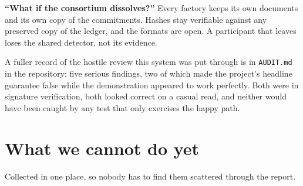 \documentclass[11pt,a4paper]{article}
\begin{document}
\textbf{``What if the consortium dissolves?''}
Every factory keeps its own documents and its own copy of the commitments.
Hashes stay verifiable against any preserved copy of the ledger, and the formats
are open. A participant that leaves loses the shared detector, not its evidence.

A fuller record of the hostile review this system was put through is in
\texttt{AUDIT.md} in the repository: five serious findings, two of which made the
project's headline guarantee false while the demonstration appeared to work
perfectly. Both were in signature verification, both looked correct on a casual
read, and neither would have been caught by any test that only exercises the
happy path.

\section{What we cannot do yet}
\label{sec:limits}

Collected in one place, so nobody has to find them scattered through the report.
\end{document}
